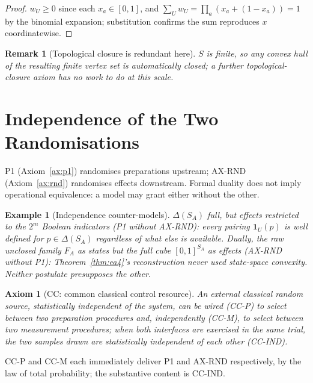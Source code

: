 \documentclass[11pt,a4paper]{article}
\newtheorem{remark}[theorem]{Remark}
\newtheorem{example}[theorem]{Example}
\newtheorem{axiom}[theorem]{Axiom}
\newcommand{\FA}{F_A}
\begin{document}
    \begin{proof}
      $w_U \geq 0$ since each $x_a \in [0,1]$, and $\sum_U w_U = \prod_a (x_a + (1-x_a)) = 1$ by the binomial
      expansion; substitution confirms the sum reproduces $x$ coordinatewise.
    \end{proof}

    \begin{remark}[Topological closure is redundant here]
      \label{rem:ea5}
      $S$ is finite, so any convex hull of the resulting finite vertex set is automatically closed; a
      further topological-closure axiom has no work to do at this scale.
    \end{remark}

  \section{Independence of the Two Randomisations}
  \label{sec:cc}

    P1 (Axiom~\ref{ax:p1}) randomises preparations upstream; AX-RND (Axiom~\ref{ax:rnd}) randomises effects
    downstream.
    Formal duality does not imply operational equivalence: a model may grant either without the other.

    \begin{example}[Independence counter-models]
      \label{ex:cc-indep}
      $\Delta(S_A)$ full, but effects restricted to the $2^m$ Boolean indicators (P1 without AX-RND): every
      pairing $\mathbf{1}_U(p)$ is well defined for $p \in \Delta(S_A)$ regardless of what else is available.
      Dually, the raw unclosed family $\FA$ as states but the full cube $[0,1]^{S_A}$ as effects (AX-RND
      without P1): Theorem~\ref{thm:ea4}'s reconstruction never used state-space convexity.
      Neither postulate presupposes the other.
    \end{example}

    \begin{axiom}[CC: common classical control resource]
      \label{ax:cc}
      An external classical random source, statistically independent of the system, can be wired (CC-P) to
      select between two preparation procedures and, independently (CC-M), to select between two measurement
      procedures; when both interfaces are exercised in the same trial, the two samples drawn are
      statistically independent of each other (CC-IND).
    \end{axiom}

    CC-P and CC-M each immediately deliver P1 and AX-RND respectively, by the law of total probability; the
    substantive content is CC-IND.
\end{document}
